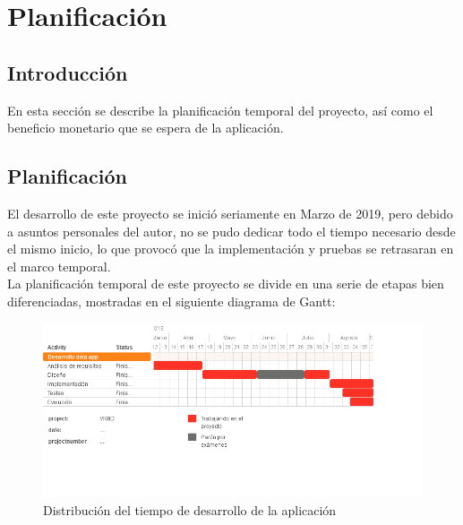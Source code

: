 \section{Planificación}

\subsection{Introducción}
\quad En esta sección se describe la planificación temporal del proyecto, así como el beneficio monetario que se espera de la aplicación.\\

\subsection{Planificación}

\quad El desarrollo de este proyecto se inició seriamente en Marzo de 2019, pero debido a asuntos personales del autor, no se pudo dedicar todo el tiempo necesario desde el mismo inicio, lo que provocó que la implementación y pruebas se retrasaran en el marco temporal.\\

\quad La planificación temporal de este proyecto se divide en una serie de etapas bien diferenciadas, mostradas en el siguiente diagrama de Gantt:\\

\begin{figure}[htb]
	\centering
	\includegraphics[width=1.2\textwidth]{./imagenes/diagramaGantt}
	\caption{Distribución del tiempo de desarrollo de la aplicación}
\end{figure}

\newpage

